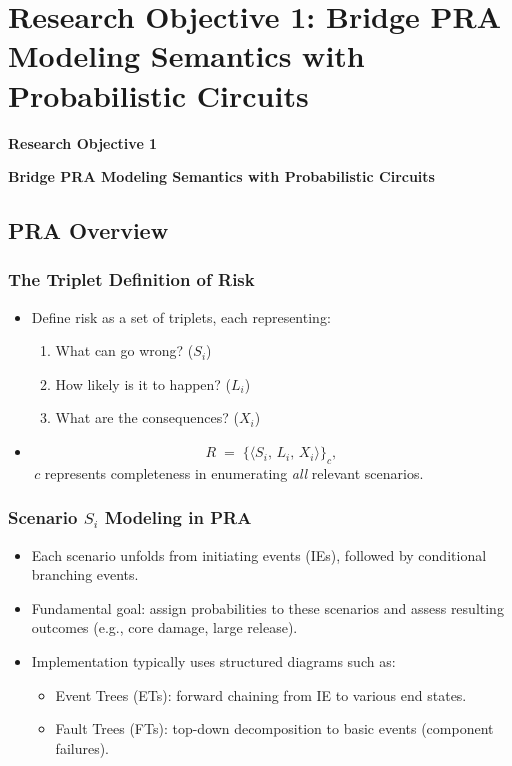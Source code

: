 \section{Research Objective 1: Bridge PRA Modeling Semantics with Probabilistic Circuits}
\begin{frame}
    \Large{\centerline{\textbf{Research Objective 1}}}
    \vspace{6pt}
    \large{\centerline{\textbf{Bridge PRA Modeling Semantics with Probabilistic Circuits}}}
\end{frame}

\subsection{PRA Overview}
\begin{frame}[allowframebreaks]
\frametitle{The Triplet Definition of Risk}
\begin{itemize}
  \item Define risk as a set of triplets, each representing:
    \begin{enumerate}
      \item What can go wrong? (\(S_i\))
      \item How likely is it to happen? (\(L_i\))
      \item What are the consequences? (\(X_i\))
    \end{enumerate}
        \vspace{6pt}
  \item
    \begin{equation}
    \label{eq:risk_triplets_slides}
      R \;=\;\bigl\{\langle S_i,\,L_i,\,X_i\rangle\bigr\}_{c},
    \end{equation}
    \(\,c\) represents completeness in enumerating \emph{all} relevant scenarios.
\end{itemize}
\end{frame}

\begin{frame}[allowframebreaks]
\frametitle{Scenario \(S_i\) Modeling in PRA}
\begin{itemize}
  \item Each scenario unfolds from initiating events (IEs), followed by conditional branching events.
          \vspace{6pt}
  \item Fundamental goal: assign probabilities to these scenarios {and} assess resulting outcomes (e.g., core damage, large release).
          \vspace{6pt}
  \item Implementation typically uses structured diagrams such as:
    \begin{itemize}
      \item Event Trees (ETs): forward chaining from IE to various end states.
      \item Fault Trees (FTs): top-down decomposition to basic events (component failures).
    \end{itemize}
\end{itemize}
\end{frame}

